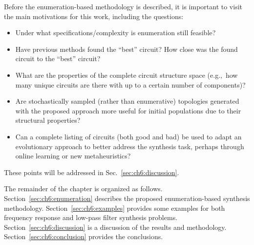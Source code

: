 Before the enumeration-based methodology is described, it is important to visit the main motivations for this work, including the questions:
\begin{itemize}
\item Under what specifications/complexity is enumeration still feasible?

\item Have previous methods found the ``best'' circuit? How close was the found circuit to the ``best'' circuit?

\item What are the properties of the complete circuit structure space (e.g.,~how many unique circuits are there with up to a certain number of components)?

\item Are stochastically sampled (rather than enumerative) topologies generated with the proposed approach more useful for initial populations due to their structural properties?

\item Can a complete listing of circuits (both good and bad) be used to adapt an evolutionary approach to better address the synthesis task, perhaps through online learning or new metaheuristics?

\end{itemize}

\noindent These points will be addressed in Sec.~\ref{sec:ch6:discussion}.

The remainder of the chapter is organized as follows. Section~\ref{sec:ch6:enumeration} describes the proposed enumeration-based synthesis methodology. Section~\ref{sec:ch6:examples} provides some examples for both frequency response and low-pass filter synthesis problems. Section~\ref{sec:ch6:discussion} is a discussion of the results and methodology. Section~\ref{sec:ch6:conclusion} provides the conclusions.